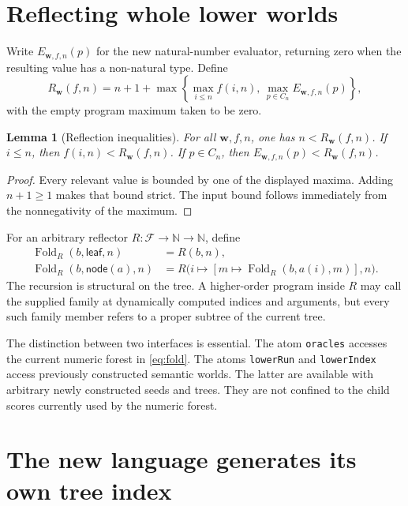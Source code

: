 \documentclass[11pt]{article}
\newtheorem{lemma}[theorem]{Lemma}
\theoremstyle{definition}
\theoremstyle{remark}
\newcommand{\N}{\mathbb N}
\newcommand{\Fam}{\mathcal F}
\newcommand{\code}[1]{\texttt{#1}}
\newcommand{\ctx}{\boldsymbol w}
\begin{document}
\section{Reflecting whole lower worlds}\label{sec:reflection}

Write $E_{\ctx,f,n}(p)$ for the new natural-number evaluator, returning zero
when the resulting value has a non-natural type. Define
\begin{equation}\label{eq:R}
 R_{\ctx}(f,n)=n+1+
 \max\left\{\max_{i\le n}f(i,n),\,
                    \max_{p\in C_n} E_{\ctx,f,n}(p)\right\},
\end{equation}
with the empty program maximum taken to be zero.

\begin{lemma}[Reflection inequalities]\label{lem:reflection}
For all $\ctx,f,n$, one has $n<R_{\ctx}(f,n)$. If $i\le n$, then
$f(i,n)<R_{\ctx}(f,n)$. If $p\in C_n$, then
$E_{\ctx,f,n}(p)<R_{\ctx}(f,n)$.
\end{lemma}
\begin{proof}
Every relevant value is bounded by one of the displayed maxima. Adding
$n+1\ge1$ makes that bound strict. The input bound follows immediately from
the nonnegativity of the maximum.
\end{proof}

For an arbitrary reflector $R:\Fam\to\N\to\N$, define
\begin{align}
 \operatorname{Fold}_R(b,\mathsf{leaf},n)&=R(b,n),\label{eq:fold}\\
 \operatorname{Fold}_R(b,\mathsf{node}(a),n)&=
 R\bigl(i\mapsto[m\mapsto\operatorname{Fold}_R(b,a(i),m)],n\bigr).
 \nonumber
\end{align}
The recursion is structural on the tree. A higher-order program inside $R$
may call the supplied family at dynamically computed indices and arguments,
but every such family member refers to a proper subtree of the current tree.

The distinction between two interfaces is essential. The atom
\code{oracles} accesses the current numeric forest in \eqref{eq:fold}. The
atoms \code{lowerRun} and \code{lowerIndex} access previously constructed
semantic worlds. The latter are available with arbitrary newly constructed
seeds and trees. They are not confined to the child scores currently used by
the numeric forest.

\section{The new language generates its own tree index}\label{sec:index}
\end{document}
